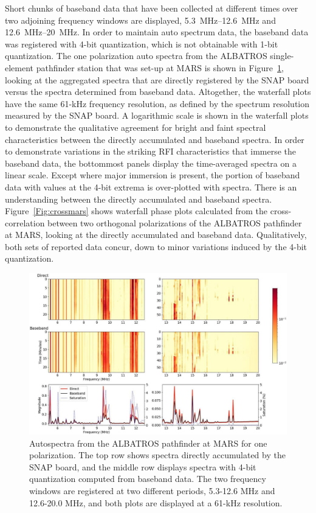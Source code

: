 Short chunks of baseband data that have been collected at different times over two adjoining frequency windows are displayed, \SIrange{5.3}{12.6}{\mega \hertz} and \SIrange{12.6}{20}{\mega \hertz}. In order to maintain auto spectrum data, the baseband data was registered with 4-bit quantization, which is not obtainable with 1-bit quantization. The one polarization auto spectra from the ALBATROS single-element pathfinder station that was set-up at MARS is shown in Figure~\ref{Fig:mars}, looking at the aggregated spectra that are directly registered by the SNAP board versus the spectra determined from baseband data. Altogether, the waterfall plots have the same 61-kHz frequency resolution, as defined by the spectrum resolution measured by the SNAP board. A logarithmic scale is shown in the waterfall plots to demonstrate the qualitative agreement for bright and faint spectral characteristics between the directly accumulated and baseband spectra. In order to demonstrate variations in the striking RFI characteristics that immerse the baseband data, the bottommost panels display the time-averaged spectra on a linear scale. Except where major immersion is present, the portion of baseband data with values at the 4-bit extrema is over-plotted with spectra. There is an understanding between the directly accumulated and baseband spectra. Figure~\ref{Fig:crossmars} shows waterfall phase plots calculated from the cross-correlation between two orthogonal polarizations of the ALBATROS pathfinder at MARS, looking at the directly accumulated and baseband data. Qualitatively, both sets of reported data concur, down to minor variations induced by the 4-bit quantization.

\begin{figure}
	\centering
	\includegraphics[width=\linewidth]{Figures/mars}
	\caption{Autospectra from the ALBATROS pathfinder at MARS for one polarization. The top row shows spectra directly accumulated by the SNAP board, and the middle row displays spectra with 4-bit quantization computed from baseband data. The two frequency windows are registered at two different periods, 5.3-12.6 MHz and 12.6-20.0 MHz, and both plots are displayed at a 61-kHz resolution.}
	\label{Fig:mars}
\end{figure}

